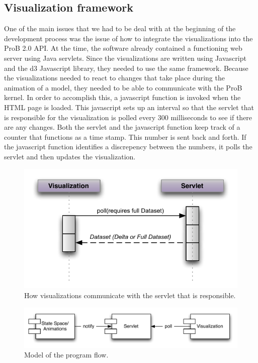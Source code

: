 \subsection{Visualization framework}

One of the main issues that we had to be deal with at the beginning of the development process was the issue of how to integrate the visualizations into the ProB 2.0 API. At the time, the software already contained a functioning web server using Java servlets. Since the visualizations are written using Javascript and the d3 Javascript library, they needed to use the same framework. Because the visualizations needed to react to changes that take place during the animation of a model, they needed to be able to communicate with the ProB kernel. In order to accomplish this, a javascript function is invoked when the HTML page is loaded. This javascript sets up an interval so that the servlet that is responsible for the visualization is polled every 300 milliseconds to see if there are any changes. Both the servlet and the javascript function keep track of a counter that functions as a time stamp. This number is sent back and forth. If the javascript function identifies a discrepency between the numbers, it polls the servlet and then updates the visualization.

\begin{figure}[h!]
\centering
\includegraphics[width=15cm]{bilder/communication.pdf}
\caption{How visualizations communicate with the servlet that is responsible.}
\label{communication}
\end{figure}

\begin{figure}[h!]
\centering
\includegraphics[width=15cm]{bilder/programFlow.pdf}
\caption{Model of the program flow.}
\label{programFlow}
\end{figure}


